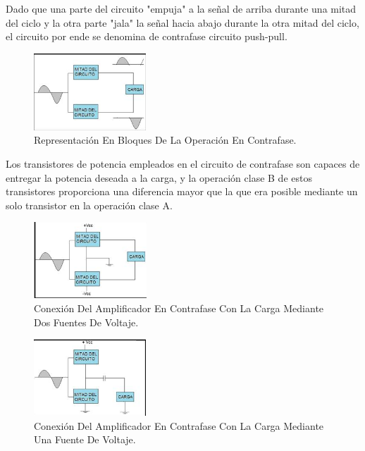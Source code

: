 \documentclass[10pt,a4paper]{article}
\begin{document}
Dado que una parte del circuito "empuja" a la señal de arriba durante una mitad del ciclo y la otra parte "jala" la señal hacia abajo durante la otra mitad del ciclo, el circuito por ende se denomina de contrafase circuito push-pull.\\
\begin{center}
\begin{figure}[hbtp]
\centering
\includegraphics[scale=0.7]{1.png}
\caption{Representación En Bloques De La Operación En Contrafase.
}
\end{figure}
\end{center}
Los transistores de potencia empleados en el circuito de contrafase son capaces de entregar la potencia deseada a la carga, y la operación clase B de estos transistores proporciona una diferencia mayor que la que era posible mediante un solo transistor en la operación clase A.\\
\begin{center}
\begin{figure}[hbtp]
\centering
\includegraphics[scale=0.7]{2.png}
\caption{Conexión Del Amplificador En Contrafase Con La Carga Mediante Dos Fuentes De Voltaje.}
\end{figure}
\begin{figure}[hbtp]
\centering
\includegraphics[scale=0.7]{3.png}
\caption{Conexión Del Amplificador En Contrafase Con La Carga Mediante Una Fuente De Voltaje.}
\end{figure}
\end{center}
\end{document}
